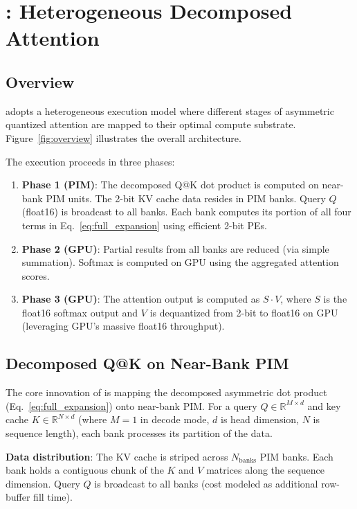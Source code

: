\section{\pimattn{}: Heterogeneous Decomposed Attention}
\label{sec:method}

\subsection{Overview}

\pimattn{} adopts a heterogeneous execution model where different stages of asymmetric quantized attention are mapped to their optimal compute substrate.
Figure~\ref{fig:overview} illustrates the overall architecture.


The execution proceeds in three phases:
\begin{enumerate}
\item \textbf{Phase 1 (PIM)}: The decomposed Q@K dot product is computed on near-bank PIM units. The 2-bit KV cache data resides in PIM banks. Query $Q$ (float16) is broadcast to all banks. Each bank computes its portion of all four terms in Eq.~\ref{eq:full_expansion} using efficient 2-bit PEs.
\item \textbf{Phase 2 (GPU)}: Partial results from all banks are reduced (via simple summation). Softmax is computed on GPU using the aggregated attention scores.
\item \textbf{Phase 3 (GPU)}: The attention output is computed as $S \cdot V$, where $S$ is the float16 softmax output and $V$ is dequantized from 2-bit to float16 on GPU (leveraging GPU's massive float16 throughput).
\end{enumerate}

\subsection{Decomposed Q@K on Near-Bank PIM}

The core innovation of \pimattn{} is mapping the decomposed asymmetric dot product (Eq.~\ref{eq:full_expansion}) onto near-bank PIM.
For a query $Q \in \mathbb{R}^{M \times d}$ and key cache $K \in \mathbb{R}^{N \times d}$ (where $M=1$ in decode mode, $d$ is head dimension, $N$ is sequence length), each bank processes its partition of the data.

\textbf{Data distribution}: The KV cache is striped across $N_{\text{banks}}$ PIM banks.
Each bank holds a contiguous chunk of the $K$ and $V$ matrices along the sequence dimension.
Query $Q$ is broadcast to all banks (cost modeled as additional row-buffer fill time).


